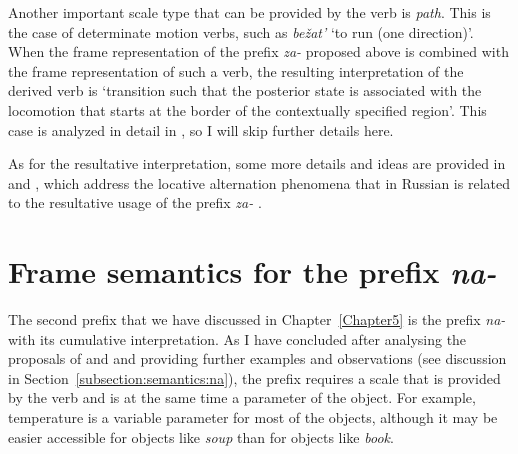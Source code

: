 Another important scale type that can be provided by the verb is \textit{path}. This is the case of determinate motion verbs, such as \textit{be\v{z}at'} `to run (one direction)'. When the frame representation of the prefix \textit{za-}   proposed above is combined with the frame representation of such a verb, the resulting interpretation of the derived verb is `transition such that the posterior state is associated with the locomotion  that starts at the border of the contextually specified region'. This case is analyzed in detail in \citet{ZinovaOsswald:paper}, so I will skip further details here.

As for the resultative  interpretation, some more details and ideas are provided in \citealt{ZinovaKallmeyer:12} and \citealt{Zinova:14}, which address the locative alternation phenomena that in Russian is related to the resultative  usage of the prefix \textit{za-}  . 

\section{Frame semantics for the prefix \textit{na-}  }\label{section:frame:na}
The second prefix that we have discussed in Chapter~\ref{Chapter5} is the prefix \textit{na-}   with its cumulative  interpretation. As I have concluded after analysing the proposals of \citet{Filip:00} and \citet{Kagan:book} and providing further examples and observations (see discussion in Section~\ref{subsection:semantics:na}), the prefix requires a scale that is provided by the verb and is at the same time a parameter of the object. For example, temperature is a variable parameter for most of the objects, although it may be easier accessible for objects like \textit{soup} than for objects like \textit{book}.


